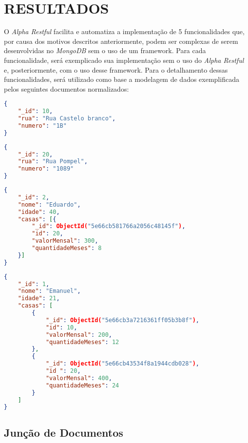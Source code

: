 \chapter{RESULTADOS}
\label{Resultados}

O \textit{Alpha Restful} facilita e automatiza a implementação de 5 funcionalidades que, por causa dos motivos descritos anteriormente, podem ser complexas de serem desenvolvidas no \textit{MongoDB} sem o uso de um framework. Para cada funcionalidade, será exemplicado sua implementação sem o uso do \textit{Alpha Restful} e, posteriormente, com o uso desse framework. Para o detalhamento dessas funcionalidades, será utilizado como base a modelagem de dados exemplificada pelos seguintes documentos normalizados:

\begin{lstlisting}[language=json, caption={Documento da Casa de Número 1B}]
{
    "_id": 10,
    "rua": "Rua Castelo branco",
    "numero": "1B"
}
\end{lstlisting}

\begin{lstlisting}[language=json, caption={Documento da Casa de Número 1089}]
{
    "_id": 20,
    "rua": "Rua Pompel",
    "numero": "1089"
}
\end{lstlisting}

\newpage

\begin{lstlisting}[language=json, caption={Documento da Pessoa \textit{Eduardo}}]
{
    "_id": 2,
    "nome": "Eduardo",
    "idade": 40,
    "casas": [{
        "_id": ObjectId("5e66cb581766a2056c48145f"),
        "id": 20,
        "valorMensal": 300,
        "quantidadeMeses": 8
    }]
}
\end{lstlisting}

\begin{lstlisting}[language=json, caption={Documento da Pessoa \textit{Emanuel}}]
{
    "_id": 1,
    "nome": "Emanuel",
    "idade": 21,
    "casas": [
        {
            "_id": ObjectId("5e66cb3a7216361ff05b3b8f"),
            "id": 10,
            "valorMensal": 200,
            "quantidadeMeses": 12
        },
        {
            "_id": ObjectId("5e66cb43534f8a1944cdb028"),
            "id ": 20,
            "valorMensal": 400,
            "quantidadeMeses": 24
        }
    ]
}
\end{lstlisting}

\section{Junção de Documentos}

